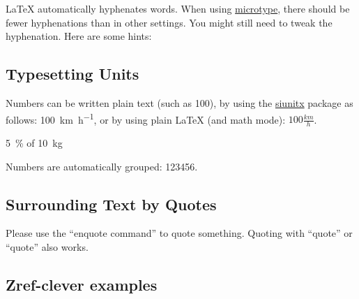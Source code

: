 \LaTeX{} automatically hyphenates words.
When using \href{https://ctan.org/pkg/microtype}{microtype}, there should be fewer hyphenations than in other settings.
You might still need to tweak the hyphenation.
Here are some hints:


\subsection{Typesetting Units}

\begin{ltgexample}
Numbers can be written plain text (such as 100), by using the \href{https://ctan.org/pkg/siunitx}{siunitx} package as follows:
\SI{100}{\km\per\hour},
or by using plain \LaTeX{} (and math mode):
$100 \frac{\mathit{km}}{h}$.
\end{ltgexample}

\begin{ltgexample}
\SI{5}{\percent} of \SI{10}{kg}
\end{ltgexample}

\begin{ltgexample}
Numbers are automatically grouped: \num{123456}.
\end{ltgexample}

\subsection{Surrounding Text by Quotes}

\begin{ltgexample}
Please use the \enquote{enquote command} to quote something.
Quoting with "`quote"' or ``quote'' also works. %

\end{ltgexample}

\subsection{Zref-clever examples}
\label{sec:ex:cref}

